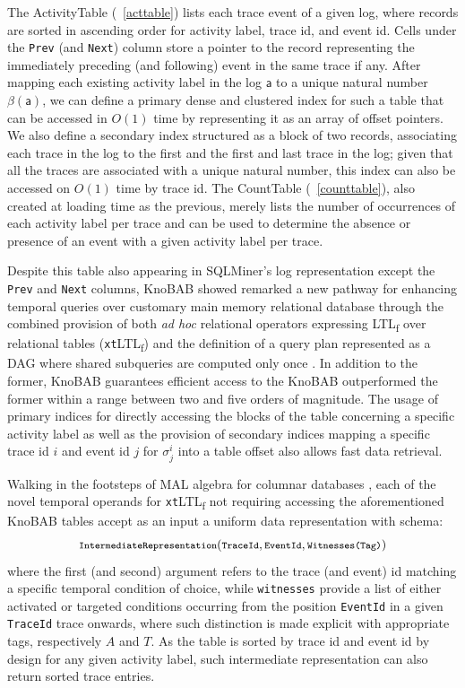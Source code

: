 \documentclass[sigconf]{acmart}
\newcommand{\const}[1]{\ensuremath{\mathsf{#1}}}
\begin{document}
The ActivityTable (\tablename~\ref{acttable}) lists each trace event of a given log, where records are sorted in ascending order for activity label, trace id, and event id. Cells under the  \texttt{Prev} (and \texttt{Next}) column store a pointer to the record representing the immediately preceding (and following) event in the same trace if any. After mapping each existing activity label in the log $\const{a}$ to a unique natural number $\beta(\const{a})$, we can define a primary dense and clustered index for such a table that can be accessed in $O(1)$ time by representing it as an array of offset pointers. We also define a secondary index structured as a block of two records, associating each trace in the log to the first and the first and last trace in the log; given that all the traces are associated with a unique natural number, this index can also be accessed on $O(1)$ time by trace id. The CountTable (\tablename~\ref{counttable}), also created at loading time as the previous, merely lists the number of occurrences of each activity label per trace and can be used to determine the absence or presence of an event with a given activity label per trace.

Despite this table also appearing in SQLMiner's log representation \cite{SchonigRCJM16} except the \texttt{Prev} and \texttt{Next} columns, KnoBAB showed remarked a new pathway for enhancing temporal queries over customary main memory relational database through the combined provision of both \textit{ad hoc}  relational operators expressing LTL\textsubscript{f} over relational tables (\texttt{xt}LTL\textsubscript{f}) and the definition of a query plan represented as a DAG where shared subqueries are computed only once \cite{BellatrecheKB21}. In addition to the former, KnoBAB guarantees efficient access to the KnoBAB outperformed the former within a range between two and five  orders of magnitude. The usage of primary indices for directly accessing the blocks of the table concerning a specific activity label as well as the provision of secondary indices mapping a specific trace id $i$ and event id $j$ for $\sigma^i_j$ into a table offset also allows fast data retrieval.

Walking in the footsteps of MAL algebra for columnar databases \cite{IdreosGNMMK12}, each of the novel temporal operands for \texttt{xt}LTL\textsubscript{f} not requiring accessing the aforementioned KnoBAB tables accept as an input a uniform data representation with schema: \[\footnotesize \texttt{IntermediateRepresentation}(\texttt{TraceId},\texttt{EventId},\texttt{Witnesses(Tag)})\] where the first (and second) argument refers to the trace (and event) id matching a specific temporal condition of choice, while \texttt{witnesses} provide a list of either  activated or targeted conditions occurring from the position \texttt{EventId} in a given \texttt{TraceId} trace onwards, where such distinction is made explicit with appropriate tags, respectively $A$ and $T$. As the table is sorted by trace id and event id by design for any given activity label, such intermediate representation can also return sorted trace entries.
\bigskip
\end{document}
